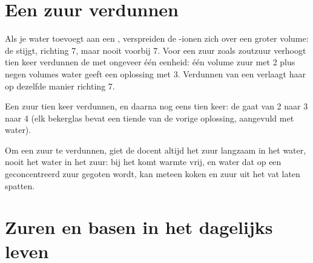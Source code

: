 \section{Een zuur verdunnen}

\begin{proposition}\label{prop:g9:acids-bases-ph:dilution}
Als je water toevoegt aan een , verspreiden de
-ionen zich over een groter volume: de  stijgt, richting 7,
maar nooit voorbij 7. Voor een zuur zoals zoutzuur verhoogt tien keer
verdunnen de  met ongeveer één eenheid: één volume zuur met  2 plus
negen volumes water geeft een oplossing met  3. Verdunnen van een
 verlaagt haar  op dezelfde manier richting 7.
\end{proposition}

\begin{omfigure}

{\small Een zuur tien keer verdunnen, en daarna nog eens tien keer: de 
gaat van 2 naar 3 naar 4 (elk bekerglas bevat een tiende van de vorige
oplossing, aangevuld met water).}
\end{omfigure}

\begin{inthelab}
Om een zuur te verdunnen, giet de docent altijd het zuur langzaam in het
water, nooit het water in het zuur: bij het  komt warmte vrij, en
water dat op een geconcentreerd zuur gegoten wordt, kan meteen koken en
zuur uit het vat laten spatten.
\end{inthelab}

\section{Zuren en basen in het dagelijks leven}

